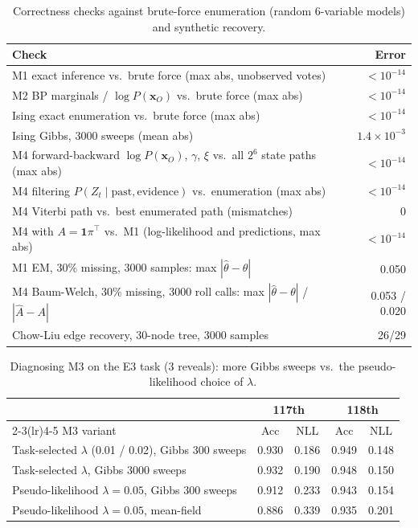 \documentclass[10pt]{article}
\begin{document}
\begin{table}[H] 
\centering\small
\caption{Correctness checks against brute-force enumeration (random 6-variable models) and synthetic recovery.}
\label{tab:checks}
\begin{tabular}{lr}
\toprule
Check & Error\\
\midrule
M1 exact inference vs.\ brute force (max abs, unobserved votes) & $<10^{-14}$\\
M2 BP marginals / $\log P(\mathbf x_O)$ vs.\ brute force (max abs) & $<10^{-14}$\\
Ising exact enumeration vs.\ brute force (max abs) & $<10^{-14}$\\
Ising Gibbs, 3000 sweeps (mean abs) & $1.4\times10^{-3}$\\
M4 forward-backward $\log P(\mathbf x_O)$, $\gamma$, $\xi$ vs.\ all $2^6$ state paths (max abs) & $<10^{-14}$\\
M4 filtering $P(Z_t\mid\text{past},\text{evidence})$ vs.\ enumeration (max abs) & $<10^{-14}$\\
M4 Viterbi path vs.\ best enumerated path (mismatches) & 0\\
M4 with $A=\mathbf 1\pi^\top$ vs.\ M1 (log-likelihood and predictions, max abs) & $<10^{-14}$\\
M1 EM, 30\% missing, 3000 samples: max $|\hat\theta-\theta|$ & 0.050\\
M4 Baum-Welch, 30\% missing, 3000 roll calls: max $|\hat\theta-\theta|$ / $|\hat A-A|$ & 0.053 / 0.020\\
Chow-Liu edge recovery, 30-node tree, 3000 samples & 26/29\\
\bottomrule
\end{tabular}
\end{table}

\begin{table}[H] 
\centering\small
\caption{Diagnosing M3 on the E3 task (3 reveals): more Gibbs sweeps vs.\ the pseudo-likelihood choice of $\lambda$.}
\label{tab:diag}
\begin{tabular}{lcccc}
\toprule
& \multicolumn{2}{c}{117th} & \multicolumn{2}{c}{118th}\\
\cmidrule(lr){2-3}\cmidrule(lr){4-5}
M3 variant & Acc & NLL & Acc & NLL\\
\midrule
Task-selected $\lambda$ (0.01 / 0.02), Gibbs 300 sweeps & 0.930 & 0.186 & 0.949 & 0.148\\
Task-selected $\lambda$, Gibbs 3000 sweeps & 0.932 & 0.190 & 0.948 & 0.150\\
Pseudo-likelihood $\lambda=0.05$, Gibbs 300 sweeps & 0.912 & 0.233 & 0.943 & 0.154\\
Pseudo-likelihood $\lambda=0.05$, mean-field & 0.886 & 0.339 & 0.935 & 0.201\\
\bottomrule
\end{tabular}
\end{table}
\end{document}
